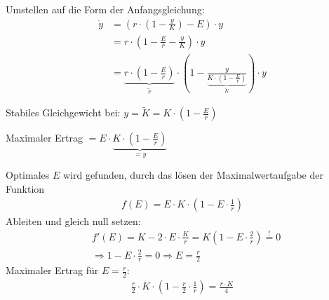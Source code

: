 \documentclass[a4paper]{article}
\begin{document}
	\noindent Umstellen auf die Form der Anfangsgleichung:		
	\begin{align*}
		\dot{y} &= \left( r \cdot\left(1 - \frac{y}{K}\right) - E\right) \cdot y \\
		&= r \cdot \left( 1 - \frac{E}{r} - \frac{y}{K} \right) \cdot y \\
		&= \underbrace{r \cdot \left( 1 - \frac{E}{r} \right)}_{\tilde{r}} \cdot \left( 1 - \frac{y}{\underbrace{K \cdot \left(1 - \frac{E}{r}\right)}_{\tilde{K}}} \right) \cdot y
	\end{align*}
	
	\noindent Stabiles Gleichgewicht bei: \(y = \tilde{K} = K \cdot \left(1 - \frac{E}{r}\right) \)
	
	\noindent Maximaler Ertrag \(= E \cdot \underbrace{K \cdot \left(1 - \frac{E}{r}\right)}_{=y}\) 
	
	\noindent Optimales \(E\) wird gefunden, durch das lösen der Maximalwertaufgabe der Funktion 
	\begin{align*}
		f(E) = E \cdot K \cdot \left(1 - E \cdot \frac{1}{r}\right)
	\end{align*}
	Ableiten und gleich null setzen:
	\begin{align*}
		&f'(E) = K - 2 \cdot E \cdot \frac{K}{r} = K \left(1 - E \cdot \frac{2}{r} \right) \stackrel{!}{=} 0 \\
		&\Rightarrow 1 - E \cdot \frac{2}{r} = 0 \Rightarrow E = \frac{r}{2}
	\end{align*}
	Maximaler Ertrag für \(E=\frac{r}{2}\):
	\begin{align*}
		\frac{r}{2} \cdot K \cdot \left(1 - \frac{r}{2}\cdot\frac{1}{r}\right) = \frac{r \cdot K}{4}
	\end{align*}
	
\end{document}
